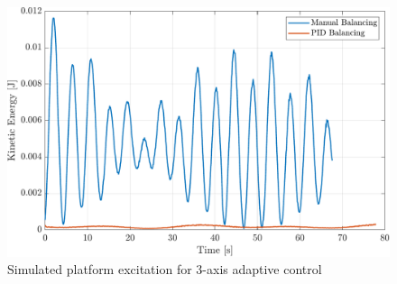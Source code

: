 \begin{figure}[!ht]
    \centering
    \includegraphics[width=\linewidth]{plots/hardware_verification_KE.pdf}
    \caption{Simulated platform excitation for 3-axis adaptive control}
\end{figure}


